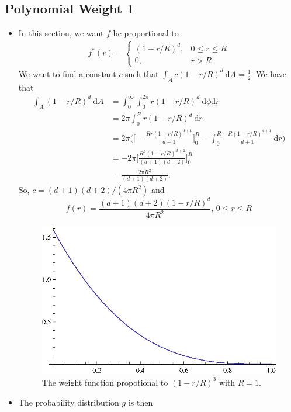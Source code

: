 \documentclass[10pt]{article}
\newcommand{\dee}{\mathrm{d}}
\begin{document}
\subsection{Polynomial Weight 1}
\begin{itemize}
	\item In this section, we want $f$ be proportional to 
		\begin{align*}
			f^*(r) = \begin{cases}
				(1 - r/R)^d, & 0 \leq r \leq R \\
				0, & r > R
			\end{cases}
		\end{align*}
		We want to find a constant $c$ such that 
		$\int_A c(1 - r/R)^d\ \dee A = \frac{1}{2}.$ 
		We have that
		\begin{align*}
			\int_A (1 - r/R)^d\ \dee A 
			&= \int_0^\infty \int_0^{2\pi} r(1 - r/R)^d\ \dee \phi \dee r\\
			&= 2\pi \int_0^{R} r(1- r/R)^d \ \dee r\\
			&= 2\pi \bigg( \bigg[ - \frac{Rr(1-r/R)^{d+1}}{d+1}\bigg]_0^R 
				- \int_0^R \frac{-R(1-r/R)^{d+1}}{d+1}\ \dee r \bigg)\\
			&= -2\pi \bigg[ \frac{R^2(1-r/R)^{d+2}}{(d+1)(d+2)} \bigg]_0^R\\
			&= \frac{2\pi R^2}{(d+1)(d+2)}.
		\end{align*}
		So, $c = (d+1)(d+2) / (4\pi R^2)$ and 
		$$f(r) = \frac{(d+1)(d+2)(1 - r/R)^d}{4 \pi R^2}\mbox{, $0 \leq r \leq R$}$$
		\begin{figure}[h]
			\centering
			\includegraphics{cubic.eps}
			\caption{The weight function propotional to $(1-r/R)^3$ with $R = 1$.}
		\end{figure}
	\item The probability distribution $g$ is then

\end{itemize}
\end{document}
